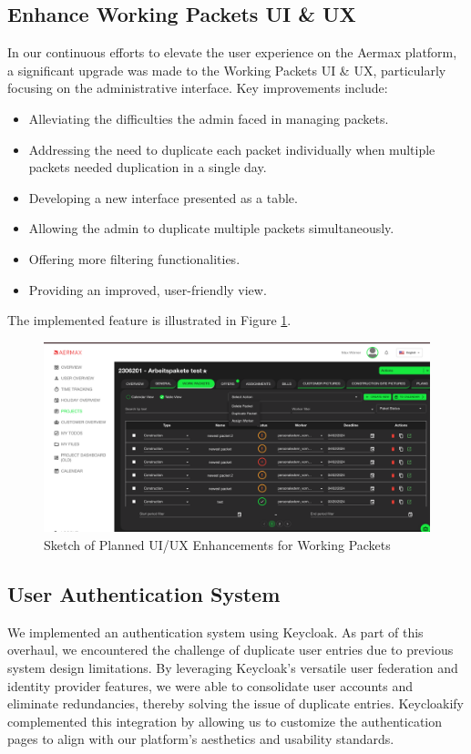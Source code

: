\subsection{Enhance Working Packets UI \& UX}
In our continuous efforts to elevate the user experience on the Aermax platform, a significant upgrade was made to the Working Packets UI \& UX, particularly focusing on the administrative interface. Key improvements include:

\begin{itemize}
    \item Alleviating the difficulties the admin faced in managing packets.
    \item Addressing the need to duplicate each packet individually when multiple packets needed duplication in a single day.
    \item Developing a new interface presented as a table.
    \item Allowing the admin to duplicate multiple packets simultaneously.
    \item Offering more filtering functionalities.
    \item Providing an improved, user-friendly view.
\end{itemize}

The implemented feature is illustrated in Figure \ref{fig:ui_ux_enhancements}.

\begin{figure}[H]
    \centering
    \includegraphics[width=1\textwidth]{src/assets/chapters/newTable2.png}
    \caption{Sketch of Planned UI/UX Enhancements for Working Packets}
    \label{fig:ui_ux_enhancements}
\end{figure}

\subsection{User Authentication System}
We implemented an authentication system using Keycloak. As part of this overhaul, we encountered the challenge of duplicate user entries due to previous system design limitations. By leveraging Keycloak’s versatile user federation and identity provider features, we were able to consolidate user accounts and eliminate redundancies, thereby solving the issue of duplicate entries. Keycloakify complemented this integration by allowing us to customize the authentication pages to align with our platform's aesthetics and usability standards.

